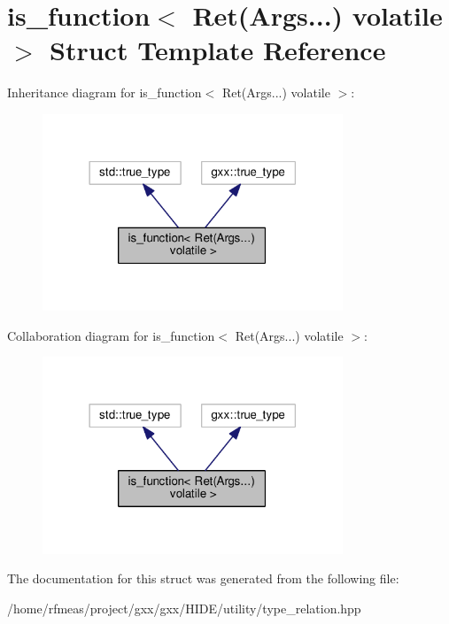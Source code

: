 \hypertarget{structis__function_3_01Ret_07Args_8_8_8_08_01volatile_01_4}{}\section{is\+\_\+function$<$ Ret(Args...) volatile $>$ Struct Template Reference}
\label{structis__function_3_01Ret_07Args_8_8_8_08_01volatile_01_4}


Inheritance diagram for is\+\_\+function$<$ Ret(Args...) volatile $>$\+:
\nopagebreak
\begin{figure}[H]
\begin{center}
\leavevmode
\includegraphics[width=254pt]{structis__function_3_01Ret_07Args_8_8_8_08_01volatile_01_4__inherit__graph}
\end{center}
\end{figure}


Collaboration diagram for is\+\_\+function$<$ Ret(Args...) volatile $>$\+:
\nopagebreak
\begin{figure}[H]
\begin{center}
\leavevmode
\includegraphics[width=254pt]{structis__function_3_01Ret_07Args_8_8_8_08_01volatile_01_4__coll__graph}
\end{center}
\end{figure}


The documentation for this struct was generated from the following file\+:\begin{DoxyCompactItemize}
\item 
/home/rfmeas/project/gxx/gxx/\+H\+I\+D\+E/utility/type\+\_\+relation.\+hpp\end{DoxyCompactItemize}
